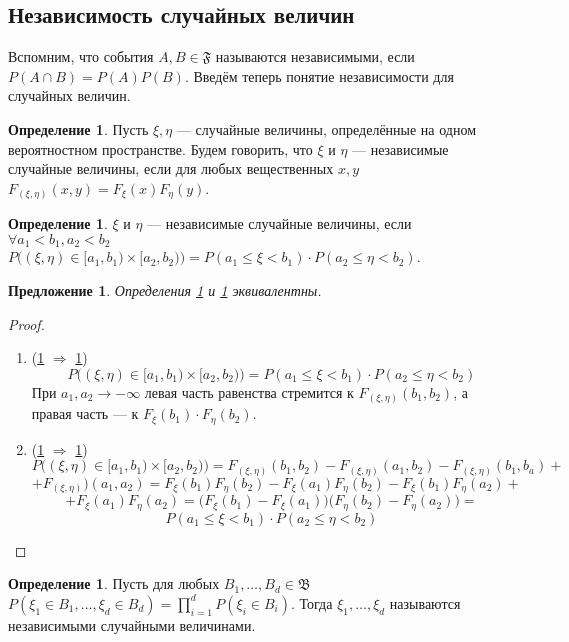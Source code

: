 \documentclass[11pt,openany,a4paper]{scrartcl}
\theoremstyle{plain}
\newtheorem{proposition}[theorem]{Предложение}
\theoremstyle{definition}
\newtheorem{definition}[theorem]{Определение}
\begin{document}
\subsection{Независимость случайных величин}

Вспомним, что события $A, B \in \mathfrak F$ называются независимыми, если
$P(A \cap B) = P(A)P(B)$. Введём теперь понятие независимости для случайных
величин.

\begin{definition}\label{random_var_independence1}
    Пусть $\xi, \eta$ — случайные величины, определённые на одном вероятностном
    пространстве. Будем говорить, что $\xi$ и $\eta$ — независимые случайные 
    величины, если для любых вещественных $x, y$
    $F_{(\xi, \eta)}(x, y) = F_\xi(x)F_\eta(y)$.
\end{definition}
\begin{definition}\label{random_var_independence2}
    $\xi$ и $\eta$ — независимые случайные величины, если
    $\forall a_1 < b_1, a_2 < b_2$ $P\big((\xi, \eta) \in [a_1, b_1) \times
    [a_2, b_2)\big) = P(a_1 \leqslant \xi < b_1) \cdot P(a_2 \leqslant
    \eta < b_2)$.
\end{definition}

\begin{proposition}
    Определения \ref{random_var_independence1} и \ref{random_var_independence2} 
    эквивалентны.
\end{proposition}
\begin{proof}
\mbox{}
    \begin{enumerate}
        \item (\ref{random_var_independence1} $\Rightarrow$
        \ref{random_var_independence2})
        $$
        P\big((\xi, \eta) \in [a_1, b_1) \times
        [a_2, b_2)\big) = P(a_1 \leqslant \xi < b_1) \cdot P(a_2 \leqslant
        \eta < b_2)
        $$
        При $a_1, a_2 \to -\infty$ левая часть равенства стремится к
        $F_{(\xi, \eta)}(b_1, b_2)$, а правая часть — к
        $F_\xi(b_1)\cdot F_\eta(b_2)$.
        \item (\ref{random_var_independence2} $\Rightarrow$
        \ref{random_var_independence1})
        $$
        P\big((\xi, \eta) \in [a_1, b_1) \times
        [a_2, b_2)\big) = F_{(\xi, \eta)}(b_1, b_2) - F_{(\xi, \eta)}(a_1, b_2)
        - F_{(\xi, \eta)}(b_1, b_a) +
        $$
        $$
        + F_{(\xi, \eta)})(a_1, a_2) = F_\xi(b_1)F_\eta(b_2) - 
        F_\xi(a_1)F_\eta(b_2) - F_\xi(b_1)F_\eta(a_2) +
        $$
        $$
        +F_\xi(a_1)F_\eta(a_2) = \big(F_\xi(b_1) - F_\xi(a_1)\big)
        \big(F_\eta(b_2) - F_\eta(a_2)\big) = 
        $$
        $$
        P(a_1 \leqslant \xi < b_1) \cdot
        P(a_2 \leqslant \eta < b_2)
        $$
    \end{enumerate}
\end{proof}
\begin{definition}\label{random_var_independence3}
    Пусть для любых $B_1,\ldots, B_d \in \mathfrak B$ $P(\xi_1 \in B_1, \ldots,
    \xi_d \in B_d) = \prod\limits_{i=1}^d P(\xi_i \in B_i)$. Тогда $\xi_1, \ldots,
    \xi_d$ называются независимыми случайными величинами.
\end{definition}
\end{document}
